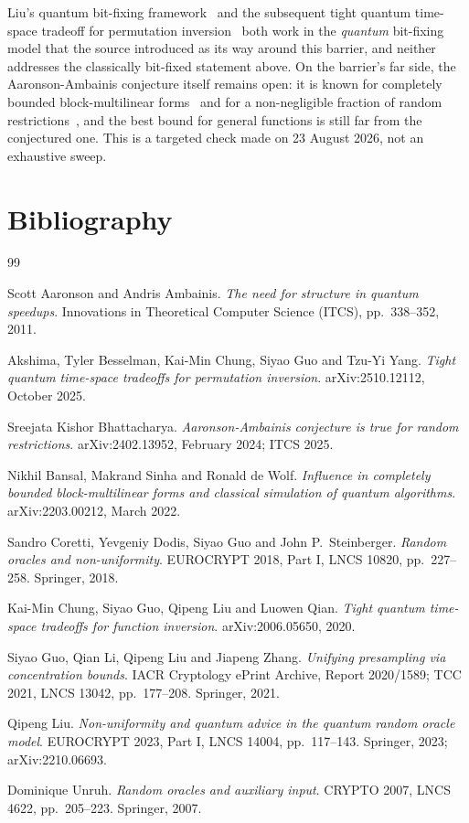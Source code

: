 \documentclass{aicr-conjecture}
\begin{document}
\begin{remark}\label{rem:since}
Liu's quantum bit-fixing framework~\cite{Liu23} and the subsequent tight
quantum time-space tradeoff for permutation inversion~\cite{ABCGY25}
both work in the \emph{quantum} bit-fixing model that the source
introduced as its way around this barrier, and neither addresses the
classically bit-fixed statement above. On the barrier's far side, the
Aaronson-Ambainis conjecture itself remains open: it is known for
completely bounded block-multilinear forms~\cite{BSW22} and for a
non-negligible fraction of random restrictions~\cite{Bha24}, and the
best bound for general functions is still far from the conjectured one.
This is a targeted check made on 23 August 2026, not an exhaustive
sweep.
\end{remark}

\section{Bibliography}

\begin{aicrbibliography}{99}

Scott Aaronson and Andris Ambainis.
\emph{The need for structure in quantum speedups}.
Innovations in Theoretical Computer Science (ITCS), pp.\ 338--352,
2011.

Akshima, Tyler Besselman, Kai-Min Chung, Siyao Guo and Tzu-Yi Yang.
\emph{Tight quantum time-space tradeoffs for permutation inversion}.
arXiv:2510.12112, October 2025.

Sreejata Kishor Bhattacharya.
\emph{Aaronson-Ambainis conjecture is true for random restrictions}.
arXiv:2402.13952, February 2024; ITCS 2025.

Nikhil Bansal, Makrand Sinha and Ronald de Wolf.
\emph{Influence in completely bounded block-multilinear forms and
classical simulation of quantum algorithms}.
arXiv:2203.00212, March 2022.

Sandro Coretti, Yevgeniy Dodis, Siyao Guo and John P.\ Steinberger.
\emph{Random oracles and non-uniformity}.
EUROCRYPT 2018, Part I, LNCS 10820, pp.\ 227--258. Springer, 2018.

Kai-Min Chung, Siyao Guo, Qipeng Liu and Luowen Qian.
\emph{Tight quantum time-space tradeoffs for function inversion}.
arXiv:2006.05650, 2020.

Siyao Guo, Qian Li, Qipeng Liu and Jiapeng Zhang.
\emph{Unifying presampling via concentration bounds}.
IACR Cryptology ePrint Archive, Report 2020/1589; TCC 2021, LNCS 13042,
pp.\ 177--208. Springer, 2021.

Qipeng Liu.
\emph{Non-uniformity and quantum advice in the quantum random oracle
model}.
EUROCRYPT 2023, Part I, LNCS 14004, pp.\ 117--143. Springer, 2023;
arXiv:2210.06693.

Dominique Unruh.
\emph{Random oracles and auxiliary input}.
CRYPTO 2007, LNCS 4622, pp.\ 205--223. Springer, 2007.

\end{aicrbibliography}
\end{document}
